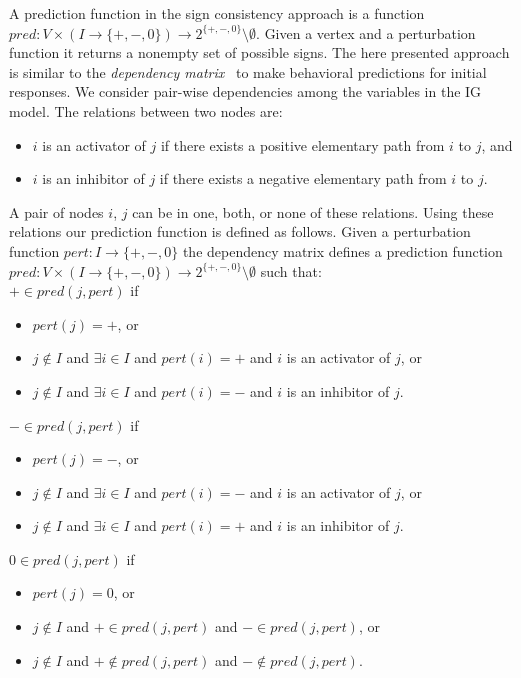 A prediction function in the sign consistency approach is a function
 $pred: V \times (I \rightarrow \{\plus,\minus,0 \}) \rightarrow 2^{\{\plus,\minus,0 \}}\setminus\emptyset$.
Given a vertex and a perturbation function it returns a nonempty set of possible signs.
The here presented approach is similar to the \emph{dependency matrix}~\cite{sk06}
to make behavioral predictions for initial responses.
We consider pair-wise dependencies among the variables in the IG model.
The relations between two nodes are:
\begin{itemize}
 \item $i$ is an activator of $j$ if there exists a positive elementary path from $i$ to $j$, and
 \item $i$ is an inhibitor of $j$ if there exists a negative elementary path from $i$ to $j$.
\end{itemize}
%
A pair of nodes $i$, $j$ can be in one, both, or none of these relations.
Using these relations our prediction function is defined as follows.
Given a perturbation function $pert: I \rightarrow \{\plus,\minus,0 \}$
 the dependency matrix defines a prediction function
 $pred: V \times (I \rightarrow \{\plus,\minus,0 \}) \rightarrow  2^{\{\plus,\minus,0 \}}\setminus\emptyset $ such that: \\
 $\plus \in pred(j,pert)$ if
\begin{itemize}
  \item $pert(j)=\plus$, or
  \item $j \notin I$ and $\exists i \in I$ and $pert(i)=\plus$  and $i$ is an activator of $j$, or
  \item $j \notin I$ and $\exists i \in I$ and $pert(i)=\minus$ and $i$ is an inhibitor of $j$.
\end{itemize}
  $\minus \in pred(j,pert)$ if
\begin{itemize}
  \item $pert(j)=\minus$, or
  \item $j \notin I$ and $\exists i \in I$ and $pert(i)=\minus$ and $i$ is an activator of $j$, or
  \item $j \notin I$ and $\exists i \in I$ and $pert(i)=\plus$  and $i$ is an inhibitor of $j$.
\end{itemize}
  $0 \in pred(j,pert)$ if
\begin{itemize}
  \item $pert(j)=0$, or
  \item $j \notin I$ and $\plus \in    pred(j,pert)$ and $\minus \in    pred(j,pert)$, or
  \item $j \notin I$ and $\plus \notin pred(j,pert)$ and $\minus \notin pred(j,pert)$.\\
\end{itemize}
